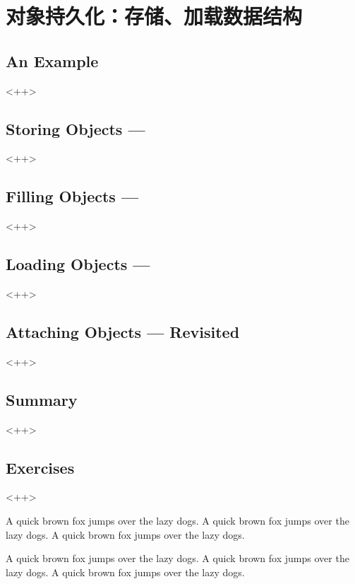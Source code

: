 

\chapter{对象持久化：存储、加载数据结构}
\label{ch:PersistentObjects}

\section{An Example}<++>

\section{Storing Objects ---}<++>

\section{Filling Objects ---}<++>

\section{Loading Objects ---}<++>

\section{Attaching Objects --- Revisited}<++>

\section{Summary}<++>

\section{Exercises}<++>

A quick brown fox jumps over the lazy dogs.
A quick brown fox jumps over the lazy dogs.
A quick brown fox jumps over the lazy dogs.

A quick brown fox jumps over the lazy dogs.
A quick brown fox jumps over the lazy dogs.
A quick brown fox jumps over the lazy dogs.


